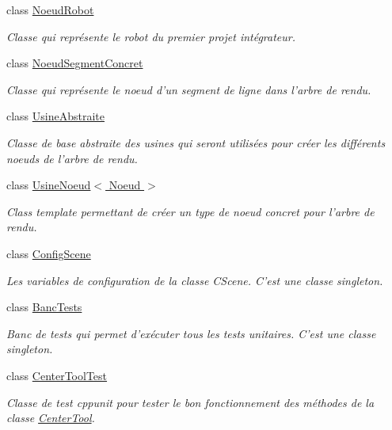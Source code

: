 \begin{DoxyCompactItemize}
class \hyperlink{class_noeud_robot}{Noeud\-Robot}
\begin{DoxyCompactList}\small\item\em Classe qui représente le robot du premier projet intégrateur. \end{DoxyCompactList}\item 
class \hyperlink{class_noeud_segment_concret}{Noeud\-Segment\-Concret}
\begin{DoxyCompactList}\small\item\em Classe qui représente le noeud d'un segment de ligne dans l'arbre de rendu. \end{DoxyCompactList}\item 
class \hyperlink{class_usine_abstraite}{Usine\-Abstraite}
\begin{DoxyCompactList}\small\item\em Classe de base abstraite des usines qui seront utilisées pour créer les différents noeuds de l'arbre de rendu. \end{DoxyCompactList}\item 
class \hyperlink{class_usine_noeud}{Usine\-Noeud$<$ Noeud $>$}
\begin{DoxyCompactList}\small\item\em Class template permettant de créer un type de noeud concret pour l'arbre de rendu. \end{DoxyCompactList}\item 
class \hyperlink{class_config_scene}{Config\-Scene}
\begin{DoxyCompactList}\small\item\em Les variables de configuration de la classe C\-Scene. C'est une classe singleton. \end{DoxyCompactList}\item 
class \hyperlink{class_banc_tests}{Banc\-Tests}
\begin{DoxyCompactList}\small\item\em Banc de tests qui permet d'exécuter tous les tests unitaires. C'est une classe singleton. \end{DoxyCompactList}\item 
class \hyperlink{class_center_tool_test}{Center\-Tool\-Test}
\begin{DoxyCompactList}\small\item\em Classe de test cppunit pour tester le bon fonctionnement des méthodes de la classe \hyperlink{class_center_tool}{Center\-Tool}. \end{DoxyCompactList}\item 

\end{DoxyCompactItemize}
